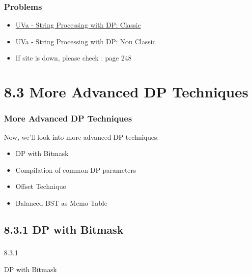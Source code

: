 \documentclass{beamer}
\begin{document}
\begin{frame}[fragile]
\frametitle{Problems}

\begin{itemize}
    \item \href{https://onlinejudge.org/index.php?option=com_onlinejudge&Itemid=8&category=751}{UVa - String Processing with DP: Classic}
        \item \href{https://onlinejudge.org/index.php?option=com_onlinejudge&Itemid=8&category=752}{UVa - String Processing with DP: Non Classic}
    \item If site is down, please check \cite{Halim}: page 248
\end{itemize}

\end{frame}


\section{8.3 More Advanced DP Techniques}
\begin{frame}[fragile]
\frametitle{More Advanced DP Techniques}

Now, we'll look into more advanced DP techniques:

\begin{itemize}
    \item DP with Bitmask
    \item Compilation of common DP parameters
    \item Offset Technique
    \item Balanced BST as Memo Table
\end{itemize}

\end{frame}

\subsection{8.3.1 DP with Bitmask}
\begin{frame}
\frametitle{}
\color{blue}
\centerline{\Large{8.3.1}}

\vspace{0.3cm} 

\centerline{\Large{DP with Bitmask}}
\color{black}
\end{frame}
\end{document}
